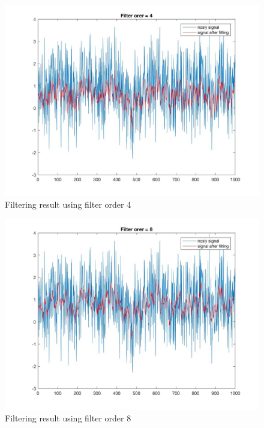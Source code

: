 \documentclass[a4paper]{article}
\begin{document}
\begin{spacing}{2.0}
\begin{figure}[H]
	\centering
	\includegraphics[width=5in]{2_1_4.jpg}
	\caption{Filtering result using filter order 4}
	\label{fig:side:a}
	\end{figure}
	  
\begin{figure}[H]
	\centering
	\includegraphics[width=5in]{2_1_8.jpg}
	\caption{Filtering result using filter order 8}
	\label{fig:side:a}
\end{figure}


\end{spacing}
\end{document}
